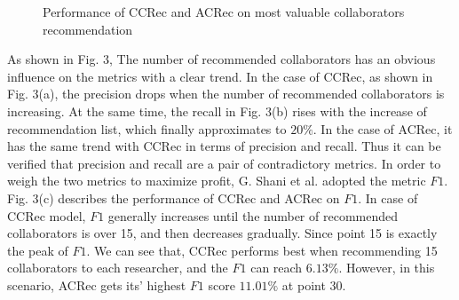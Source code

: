 \documentclass[review]{elsarticle}
\begin{document}
\begin{figure}
\centering
{}
\caption{Performance of CCRec and ACRec on most valuable collaborators recommendation}
\label{fig:3}
\end{figure}

As shown in Fig. 3, The number of recommended collaborators has an obvious influence on the metrics with a clear trend. In the case of CCRec, as shown in Fig. 3(a), the precision drops when the number of recommended collaborators is increasing. At the same time, the recall in Fig. 3(b) rises with the increase of recommendation list, which finally approximates to $20\%$. In the case of ACRec, it has the same trend with CCRec in terms of precision and recall. Thus it can be verified that precision and recall are a pair of contradictory metrics. In order to weigh the two metrics to maximize profit, G. Shani et al. \cite{shani2011evaluating} adopted the metric $F1$. Fig. 3(c) describes the performance of CCRec and ACRec on $F1$. In case of CCRec model, $F1$ generally increases until the number of recommended collaborators is over 15, and then decreases gradually. Since point 15 is exactly the peak of $F1$. We can see that, CCRec performs best when recommending 15 collaborators to each researcher, and the $F1$ can reach $6.13\%$. However, in this scenario, ACRec gets its' highest $F1$ score $11.01\%$ at point 30.
\end{document}
